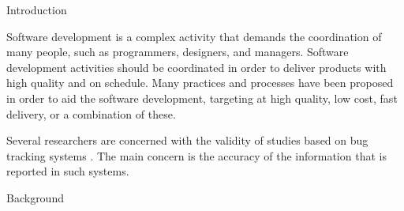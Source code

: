 \begin{section}{Introduction}

Software development is a complex activity that demands the coordination of many people, such as programmers, designers, and managers. Software development activities should be coordinated in order to deliver products with high quality and on schedule. Many practices and processes have been proposed in order to aid the software development, targeting at high quality, low cost, fast delivery, or a combination of these.

Several researchers are concerned with the validity of studies based on bug tracking systems \cite{Aranda2009,Bird2009,Nguyen2010,Ayari2007}. The main concern is the accuracy of the information that is reported in such systems.
\end{section}

\begin{section}{Background}
\end{section}

